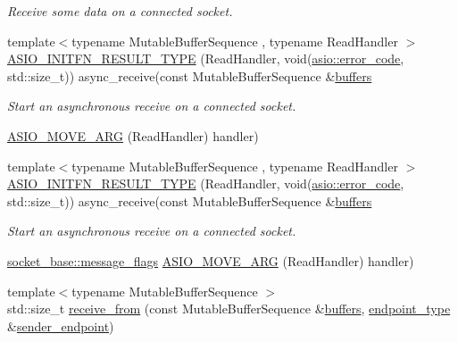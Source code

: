 \begin{DoxyCompactItemize}
\begin{DoxyCompactList}\small\item\em Receive some data on a connected socket. \end{DoxyCompactList}\item 
{\footnotesize template$<$typename Mutable\+Buffer\+Sequence , typename Read\+Handler $>$ }\\\hyperlink{classasio_1_1basic__datagram__socket_abe561e7d74eac080923bfb052a42fbbb}{A\+S\+I\+O\+\_\+\+I\+N\+I\+T\+F\+N\+\_\+\+R\+E\+S\+U\+L\+T\+\_\+\+T\+Y\+P\+E} (Read\+Handler, void(\hyperlink{classasio_1_1error__code}{asio\+::error\+\_\+code}, std\+::size\+\_\+t)) async\+\_\+receive(const Mutable\+Buffer\+Sequence \&\hyperlink{group__async__read_ga54dede45c3175148a77fe6635222c47d}{buffers}
\begin{DoxyCompactList}\small\item\em Start an asynchronous receive on a connected socket. \end{DoxyCompactList}\item 
\hyperlink{classasio_1_1basic__datagram__socket_acd890ee5f168f8570cfb0ad43292a9f7}{A\+S\+I\+O\+\_\+\+M\+O\+V\+E\+\_\+\+A\+R\+G} (Read\+Handler) handler)
\item 
{\footnotesize template$<$typename Mutable\+Buffer\+Sequence , typename Read\+Handler $>$ }\\\hyperlink{classasio_1_1basic__datagram__socket_abe561e7d74eac080923bfb052a42fbbb}{A\+S\+I\+O\+\_\+\+I\+N\+I\+T\+F\+N\+\_\+\+R\+E\+S\+U\+L\+T\+\_\+\+T\+Y\+P\+E} (Read\+Handler, void(\hyperlink{classasio_1_1error__code}{asio\+::error\+\_\+code}, std\+::size\+\_\+t)) async\+\_\+receive(const Mutable\+Buffer\+Sequence \&\hyperlink{group__async__read_ga54dede45c3175148a77fe6635222c47d}{buffers}
\begin{DoxyCompactList}\small\item\em Start an asynchronous receive on a connected socket. \end{DoxyCompactList}\item 
\hyperlink{classasio_1_1socket__base_ac3cf77465dfedfe1979b5415cf32cc94}{socket\+\_\+base\+::message\+\_\+flags} \hyperlink{classasio_1_1basic__datagram__socket_a36dcb52d9734262237d2ae87635907fd}{A\+S\+I\+O\+\_\+\+M\+O\+V\+E\+\_\+\+A\+R\+G} (Read\+Handler) handler)
\item 
{\footnotesize template$<$typename Mutable\+Buffer\+Sequence $>$ }\\std\+::size\+\_\+t \hyperlink{classasio_1_1basic__datagram__socket_a9404f9e438cda7d7ba6f34dcfff7dba3}{receive\+\_\+from} (const Mutable\+Buffer\+Sequence \&\hyperlink{group__async__read_ga54dede45c3175148a77fe6635222c47d}{buffers}, \hyperlink{classasio_1_1basic__datagram__socket_af952c8d18c85588a16531cfc54a172bb}{endpoint\+\_\+type} \&\hyperlink{classasio_1_1basic__datagram__socket_aab9cb430375ca536da3d5a145e6b780e}{sender\+\_\+endpoint})

\end{DoxyCompactItemize}
